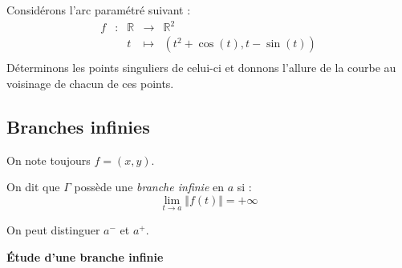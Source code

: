 \documentclass[a4paper,10pt]{report}
\begin{document}
\medskip

\begin{Exemple} Considérons l'arc paramétré suivant :
$$ \begin{array}{lllll}
f & : & \mathbb{R} & \rightarrow & \mathbb{R}^2 \\
& & t & \mapsto &(t^2+ \cos(t), t- \sin(t)) \\
\end{array}$$
Déterminons les points singuliers de celui-ci et donnons l'allure de la courbe au voisinage de chacun de ces points.

\vspace{9cm}
\end{Exemple}

\subsection{Branches infinies}
On note toujours $f=(x,y)$.

\begin{Definition}{} On dit que $\Gamma$ possède une \emph{branche infinie} en $a$ si :
$$ \lim_{t \rightarrow a} \Vert f(t) \Vert = + \infty$$
\end{Definition}

\begin{Remarque}{} On peut distinguer $a^{-}$ et $a^{+}$.
\end{Remarque}

\medskip

\begin{center}
 \textbf{Étude d'une branche infinie}
 \end{center} 
 
\end{document}
